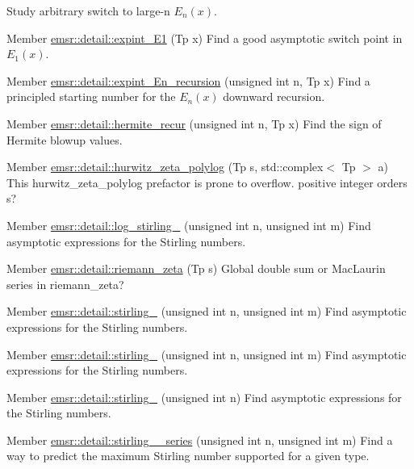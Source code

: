 \begin{DoxyRefList}
\label{todo__todo000006}%
%
Study arbitrary switch to large-\/n $ E_n(x) $.  
\item[Member \mbox{\hyperlink{namespaceemsr_1_1detail_a73f0059aa33d1c8668b997c92462690b}{emsr\+::detail\+::expint\+\_\+\+E1}} (Tp x)]\label{todo__todo000005}%
%
Find a good asymptotic switch point in $ E_1(x) $.  
\item[Member \mbox{\hyperlink{namespaceemsr_1_1detail_a1601239a0f3c3df051f9eb73b7929a62}{emsr\+::detail\+::expint\+\_\+\+En\+\_\+recursion}} (unsigned int n, Tp x)]\label{todo__todo000004}%
%
Find a principled starting number for the $ E_n(x) $ downward recursion.  
\item[Member \mbox{\hyperlink{namespaceemsr_1_1detail_a2961ca16a5c8e04d40805e22ef857c90}{emsr\+::detail\+::hermite\+\_\+recur}} (unsigned int n, Tp x)]\label{todo__todo000008}%
%
Find the sign of Hermite blowup values.  
\item[Member \mbox{\hyperlink{namespaceemsr_1_1detail_a6601807b5cd703d784ca3420fcab7e74}{emsr\+::detail\+::hurwitz\+\_\+zeta\+\_\+polylog}} (Tp s, std\+::complex$<$ Tp $>$ a)]\label{todo__todo000010}%
%
This hurwitz\+\_\+zeta\+\_\+polylog prefactor is prone to overflow. positive integer orders s?  
\item[Member \mbox{\hyperlink{namespaceemsr_1_1detail_a4bdacca9c4e94fe56f2e883e49f01901}{emsr\+::detail\+::log\+\_\+stirling\+\_\+2}} (unsigned int n, unsigned int m)]\label{todo__todo000014}%
%
Find asymptotic expressions for the Stirling numbers.  
\item[Member \mbox{\hyperlink{namespaceemsr_1_1detail_a4b6c431e9f196c2e6418b7389da4984f}{emsr\+::detail\+::riemann\+\_\+zeta}} (Tp s)]\label{todo__todo000017}%
%
Global double sum or Mac\+Laurin series in riemann\+\_\+zeta?  
\item[Member \mbox{\hyperlink{namespaceemsr_1_1detail_a799d6d24c03bbcc2cf23ce10d30d89a7}{emsr\+::detail\+::stirling\+\_\+1}} (unsigned int n, unsigned int m)]\label{todo__todo000015}%
%
Find asymptotic expressions for the Stirling numbers.  
\item[Member \mbox{\hyperlink{namespaceemsr_1_1detail_ad22ad618eb21b59549c25b6f37f89c8f}{emsr\+::detail\+::stirling\+\_\+2}} (unsigned int n, unsigned int m)]\label{todo__todo000012}%
%
Find asymptotic expressions for the Stirling numbers.  
\item[Member \mbox{\hyperlink{namespaceemsr_1_1detail_a232ba80e00929f147a9cfc13fa40b7cd}{emsr\+::detail\+::stirling\+\_\+2}} (unsigned int n)]\label{todo__todo000013}%
%
Find asymptotic expressions for the Stirling numbers.  
\item[Member \mbox{\hyperlink{namespaceemsr_1_1detail_ab3d6e5cf8e54fb115200d35ec6763837}{emsr\+::detail\+::stirling\+\_\+2\+\_\+series}} (unsigned int n, unsigned int m)]\label{todo__todo000011}%
%
Find a way to predict the maximum Stirling number supported for a given type. 
\end{DoxyRefList}